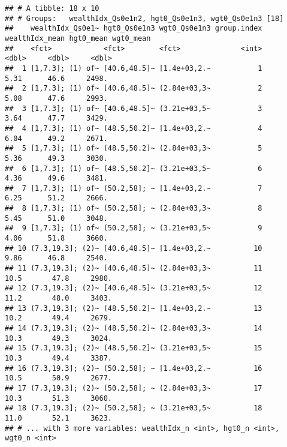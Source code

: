 \documentclass[
]{book}
\newenvironment{Shaded}{\begin{snugshade}}{\end{snugshade}}
\newcommand{\KeywordTok}[1]{\textcolor[rgb]{0.13,0.29,0.53}{\textbf{#1}}}
\newcommand{\NormalTok}[1]{#1}
\newcommand{\OperatorTok}[1]{\textcolor[rgb]{0.81,0.36,0.00}{\textbf{#1}}}
\newcommand{\StringTok}[1]{\textcolor[rgb]{0.31,0.60,0.02}{#1}}
\begin{document}
\begin{verbatim}
## # A tibble: 18 x 10
## # Groups:   wealthIdx_Qs0e1n2, hgt0_Qs0e1n3, wgt0_Qs0e1n3 [18]
##    wealthIdx_Qs0e1~ hgt0_Qs0e1n3 wgt0_Qs0e1n3 group.index wealthIdx_mean hgt0_mean wgt0_mean
##    <fct>            <fct>        <fct>              <int>          <dbl>     <dbl>     <dbl>
##  1 [1,7.3]; (1) of~ [40.6,48.5]~ [1.4e+03,2.~           1           5.31      46.6     2498.
##  2 [1,7.3]; (1) of~ [40.6,48.5]~ (2.84e+03,3~           2           5.08      47.6     2993.
##  3 [1,7.3]; (1) of~ [40.6,48.5]~ (3.21e+03,5~           3           3.64      47.7     3429.
##  4 [1,7.3]; (1) of~ (48.5,50.2]~ [1.4e+03,2.~           4           6.04      49.2     2671.
##  5 [1,7.3]; (1) of~ (48.5,50.2]~ (2.84e+03,3~           5           5.36      49.3     3030.
##  6 [1,7.3]; (1) of~ (48.5,50.2]~ (3.21e+03,5~           6           4.36      49.6     3481.
##  7 [1,7.3]; (1) of~ (50.2,58]; ~ [1.4e+03,2.~           7           6.25      51.2     2666.
##  8 [1,7.3]; (1) of~ (50.2,58]; ~ (2.84e+03,3~           8           5.45      51.0     3048.
##  9 [1,7.3]; (1) of~ (50.2,58]; ~ (3.21e+03,5~           9           4.06      51.8     3660.
## 10 (7.3,19.3]; (2)~ [40.6,48.5]~ [1.4e+03,2.~          10           9.86      46.8     2540.
## 11 (7.3,19.3]; (2)~ [40.6,48.5]~ (2.84e+03,3~          11          10.5       47.8     2980.
## 12 (7.3,19.3]; (2)~ [40.6,48.5]~ (3.21e+03,5~          12          11.2       48.0     3403.
## 13 (7.3,19.3]; (2)~ (48.5,50.2]~ [1.4e+03,2.~          13          10.2       49.4     2679.
## 14 (7.3,19.3]; (2)~ (48.5,50.2]~ (2.84e+03,3~          14          10.3       49.3     3024.
## 15 (7.3,19.3]; (2)~ (48.5,50.2]~ (3.21e+03,5~          15          10.3       49.4     3387.
## 16 (7.3,19.3]; (2)~ (50.2,58]; ~ [1.4e+03,2.~          16          10.5       50.9     2677.
## 17 (7.3,19.3]; (2)~ (50.2,58]; ~ (2.84e+03,3~          17          10.3       51.3     3060.
## 18 (7.3,19.3]; (2)~ (50.2,58]; ~ (3.21e+03,5~          18          11.0       52.1     3623.
## # ... with 3 more variables: wealthIdx_n <int>, hgt0_n <int>, wgt0_n <int>
\end{verbatim}

\begin{Shaded}
\end{Shaded}
\end{document}

